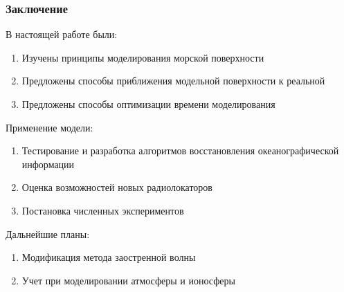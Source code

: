 \documentclass[10pt,pdf,hyperref={unicode}, dvipsnames]{beamer}
\begin{document}
\begin{frame}[t]
	\frametitle{Заключение}
	\vfill
    В настоящей работе были:
		\begin{enumerate}
			\item Изучены принципы моделирования морской поверхности

			\item Предложены способы приближения модельной поверхности к
                реальной

			\item Предложены способы оптимизации времени моделирования
		\end{enumerate}
		\vfill

    Применение модели:

	\begin{enumerate}
		\item Тестирование и разработка алгоритмов восстановления океанографической информации
		\item Оценка возможностей новых радиолокаторов
		\item Постановка численных экспериментов
	\end{enumerate}
	\vfill

    Дальнейшие планы: 
	\begin{enumerate}
		\item Модификация метода заостренной волны
        \item Учет при моделировании атмосферы и ионосферы
	\end{enumerate}
	\vfill
    
\end{frame}
\end{document}
